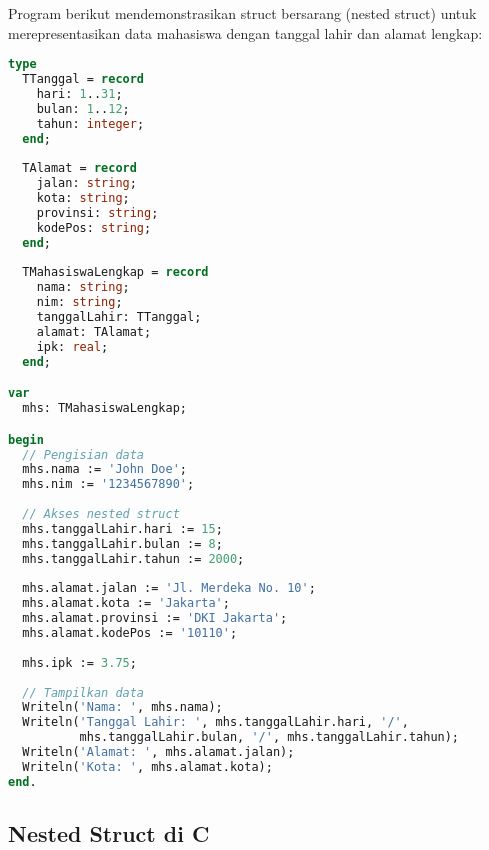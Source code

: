 \documentclass[../main.tex]{subfiles}
\begin{document}
Program berikut mendemonstrasikan struct bersarang (nested struct) untuk merepresentasikan data mahasiswa dengan tanggal lahir dan alamat lengkap:

\begin{lstlisting}[language=Pascal, caption={Nested struct di Pascal}]
type
  TTanggal = record
    hari: 1..31;
    bulan: 1..12;
    tahun: integer;
  end;
  
  TAlamat = record
    jalan: string;
    kota: string;
    provinsi: string;
    kodePos: string;
  end;
  
  TMahasiswaLengkap = record
    nama: string;
    nim: string;
    tanggalLahir: TTanggal;
    alamat: TAlamat;
    ipk: real;
  end;

var
  mhs: TMahasiswaLengkap;

begin
  // Pengisian data
  mhs.nama := 'John Doe';
  mhs.nim := '1234567890';
  
  // Akses nested struct
  mhs.tanggalLahir.hari := 15;
  mhs.tanggalLahir.bulan := 8;
  mhs.tanggalLahir.tahun := 2000;
  
  mhs.alamat.jalan := 'Jl. Merdeka No. 10';
  mhs.alamat.kota := 'Jakarta';
  mhs.alamat.provinsi := 'DKI Jakarta';
  mhs.alamat.kodePos := '10110';
  
  mhs.ipk := 3.75;
  
  // Tampilkan data
  Writeln('Nama: ', mhs.nama);
  Writeln('Tanggal Lahir: ', mhs.tanggalLahir.hari, '/',
          mhs.tanggalLahir.bulan, '/', mhs.tanggalLahir.tahun);
  Writeln('Alamat: ', mhs.alamat.jalan);
  Writeln('Kota: ', mhs.alamat.kota);
end.
\end{lstlisting}

\subsection{Nested Struct di C}
\end{document}
